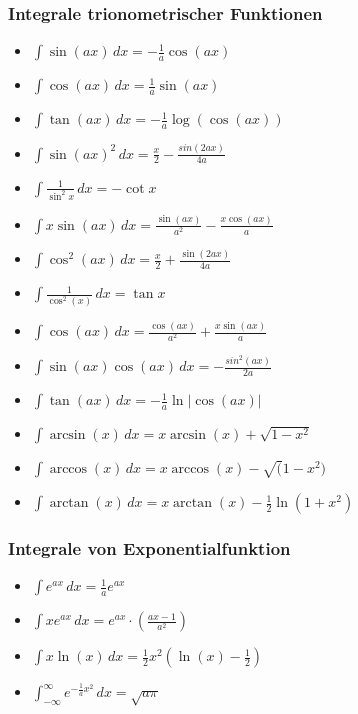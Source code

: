 \subsubsection{Integrale trionometrischer Funktionen}
\begin{itemize}[leftmargin=*]
	\item $\int \sin(ax) \,dx = -\frac{1}{a}\cos(ax)$
	\item $\int \cos(ax) \,dx = \frac{1}{a}\sin(ax)$
	\item $\int \tan(ax) \,dx = -\frac{1}{a}\log(\cos(ax))$ 
	\item $\int \sin(ax)^2 \,dx = \frac{x}{2} - \frac{sin(2ax)}{4a}$
	\item $\int \frac{1}{\sin^2 x} \,dx = -\cot x$
	\item $\int x \sin(ax) \,dx = \frac{\sin(ax)}{a^2} - \frac{x \cos(ax)}{a}$
	\item $\int \cos^2(ax) \,dx = \frac{x}{2} + \frac{\sin(2ax)}{4a}$
	\item $\int \frac{1}{\cos^2(x)} \,dx = \tan x$
	\item $\int \cos(ax) \,dx = \frac{\cos(ax)}{a^2} + \frac{x \sin(ax)}{a}$
	\item $\int \sin(ax) \cos(ax) \,dx = -\frac{sin^2(ax)}{2a}$
	\item $\int \tan(ax) \,dx = - \frac{1}{a} \ln | \cos(ax) |$
	\item $\int \arcsin(x) \,dx = x \arcsin(x) + \sqrt{1 - x^2}$
	\item $\int \arccos(x) \,dx = x \arccos(x) - \sqrt(1-x^2)$
	\item $\int \arctan(x) \,dx = x \arctan(x) - \frac{1}{2} \ln(1+x^2)$
\end{itemize}

\subsubsection{Integrale von Exponentialfunktion}
\begin{itemize}[leftmargin=*]
  	\item $\int e^{ax} \,dx = \frac{1}{a} e^{ax}$ 
	\item $\int x e^{ax} \,dx = e^{ax} \cdot \left ( \frac{ax - 1}{a^2} \right )$
	\item $\int x \ln(x) \,dx = \frac{1}{2} x^2 (\ln(x) - \frac{1}{2})$
	\item $\int_{-\infty}^\infty e^{-\frac{1}{a}x^2} \,dx = \sqrt{a \pi}$
\end{itemize}

